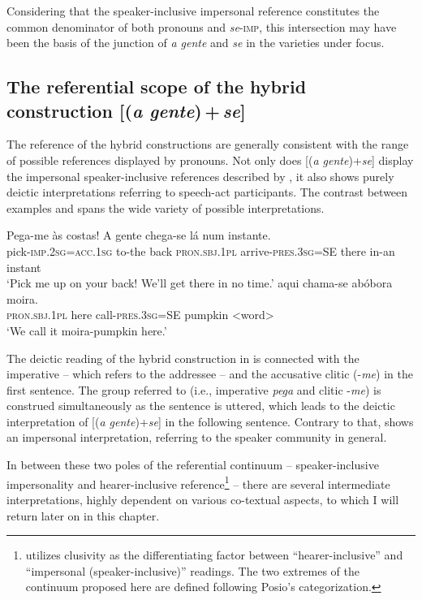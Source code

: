 \documentclass[output=paper]{langscibook}
\begin{document}
Considering that the speaker-inclusive impersonal reference constitutes the common denominator of both  pronouns and \textit{se}-\textsc{imp}, this intersection may have been the basis of the junction of \textit{a gente} and \textit{se} in the varieties under focus.

\subsection{The referential scope of the hybrid construction [(\textit{a gente})\,+\,\textit{se}]}\label{sec:henriques:4.3}


The reference of the hybrid constructions are generally consistent with the range of possible references displayed by  pronouns. Not only does [(\textit{a gente})+\textit{se}] display the impersonal speaker-inclusive references described by \citet[186–188]{Martins2009}, it also shows purely deictic interpretations referring to speech-act participants. The contrast between examples  and  spans the wide variety of possible interpretations.

\ea\label{ex:henriques:18}
 \gll Pega-me às costas! {A gente} chega-se lá num instante.\\
         pick-\textsc{imp.2sg=acc.1sg} to-the back \textsc{pron.sbj.1pl} arrive-\textsc{pres.3sg}=SE there in-an instant\\
\glt `Pick me up on your back! We'll get there in no time.'
\ex\label{ex:henriques:19}
  aqui chama-se abóbora moira.\\
         \textsc{pron.sbj.1pl} here call-\textsc{pres.3sg}=SE pumpkin <word>\\
 \glt `We call it moira-pumpkin here.'
\z 



The deictic reading of the hybrid construction in  is connected with the imperative  -- which refers to the addressee --  and the accusative clitic (-\textit{me}) in the first sentence. The group referred to (i.e.,  imperative \textit{pega} and  clitic -\textit{me}) is construed simultaneously as the sentence is uttered, which leads to the deictic interpretation of [(\textit{a gente})+\textit{se}] in the following sentence. Contrary to that,  shows an impersonal interpretation, referring to the speaker community in general.



In between these two poles of the referential continuum  -- speaker-inclusive impersonality and hearer-inclusive reference\footnote{\citet[342]{Posio2012} utilizes clusivity as the differentiating factor between “hearer-inclusive” and “impersonal (speaker-inclusive)” readings. The two extremes of the continuum proposed here are defined following Posio's categorization.} --  there are several intermediate interpretations, highly dependent on various co-textual aspects, to which I will return later on in this chapter.
\end{document}
